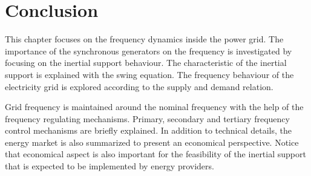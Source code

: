 \section{Conclusion}
This chapter focuses on the frequency dynamics inside the power grid. The importance of the synchronous generators on the frequency is investigated by focusing on the inertial support behaviour. The characteristic of the inertial support is explained with the swing equation. The frequency behaviour of the electricity grid is explored according to the supply and demand relation. \par
Grid frequency is maintained around the nominal frequency with the help of the frequency regulating mechanisms. Primary, secondary and tertiary frequency control mechanisms are briefly explained. In addition to technical details, the energy market is also summarized to present an economical perspective. Notice that economical aspect is also important for the feasibility of the inertial support that is expected to be implemented by energy providers.